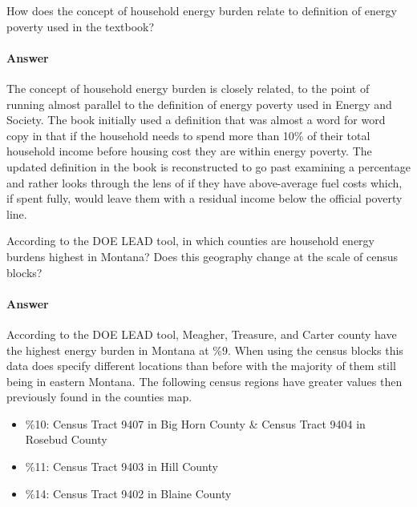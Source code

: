 \documentclass{article}
\begin{document}
How does the concept of household energy burden relate to definition of energy
poverty used in the textbook?

\paragraph{Answer}

The concept of household energy burden is closely related, to the point
of running almost parallel to the definition of energy poverty used in Energy and
Society. The book initially used a definition that was almost a word for word
copy in that if the household needs to spend more than 10\% of their total
household income before housing cost they are within energy poverty. The updated
definition in the book is reconstructed to go past examining a percentage and
rather looks through the lens of if they have above-average fuel costs which,
if spent fully, would leave them with a residual income below the official
poverty line.

 

According to the DOE LEAD tool, in which counties are household energy burdens
highest in Montana? Does this geography change at the scale of census blocks?

\paragraph{Answer}

According to the DOE LEAD tool, Meagher, Treasure, and Carter county have the
highest energy burden in Montana at \%9. When using the census blocks this data
does specify different locations than before with the majority of them still
being in eastern Montana. The following census regions have greater values then
previously found in the counties map.
\begin{itemize}
    \item  \%10: Census Tract 9407 in Big Horn County \& Census Tract 9404 in Rosebud County
    \item  \%11: Census Tract 9403 in Hill County
    \item  \%14: Census Tract 9402 in Blaine County
\end{itemize}


 
\end{document}

